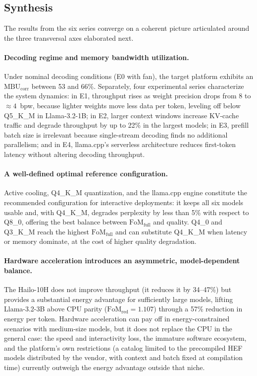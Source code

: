\documentclass[acmsmall,natbib=false]{acmart}
\begin{document}
\subsection{Synthesis}\label{sec:synthesis}

The results from the six series converge on a coherent picture articulated around the three
transversal axes elaborated next. 

\paragraph{Decoding regime and memory bandwidth utilization.}%
Under nominal decoding conditions (E0 with fan), the target platform exhibits an
$\mathrm{MBU}_{\mathrm{corr}}$ between 53 and 66\%. Separately, four experimental
series characterize the system dynamics: in E1, throughput rises as weight
precision drops from 8 to ${\approx}4$~bpw, because lighter weights move less data
per token, leveling off below Q5\_K\_M in Llama-3.2-1B; in E2, larger context
windows increase KV-cache traffic and degrade throughput by up to 22\% in the
largest models; in E3, prefill batch size is irrelevant because single-stream
decoding finds no additional parallelism; and in E4, llama.cpp's serverless
architecture reduces first-token latency without altering decoding throughput.

\paragraph{A well-defined optimal reference configuration.}
Active cooling, Q4\_K\_M quantization, and the llama.cpp engine constitute
the recommended configuration for interactive deployments: it keeps all six
models usable and, with Q4\_K\_M, degrades perplexity by less than 5\% with
respect to Q8\_0, offering the best balance between $\mathrm{FoM}_{\mathrm{full}}$ and quality.
Q4\_0 and Q3\_K\_M reach the highest $\mathrm{FoM}_{\mathrm{full}}$ and can substitute Q4\_K\_M when
latency or memory dominate, at the cost of higher quality degradation.

\paragraph{Hardware acceleration introduces an asymmetric, model-dependent
balance.}
The Hailo-10H does not improve throughput (it reduces it by 34--47\%) but
provides a substantial energy advantage for sufficiently large models,
lifting Llama-3.2-3B above CPU parity
($\mathrm{FoM}_{\mathrm{red}}=1.107$) through a 57\% reduction in energy per
token. Hardware acceleration can pay off in energy-constrained scenarios
with medium-size models, but it does not replace the CPU in the general
case: the speed and interactivity loss, the immature software ecosystem, and
the platform's own restrictions (a catalog limited to the precompiled HEF
models distributed by the vendor, with context and batch fixed at
compilation time) currently outweigh the energy advantage outside that
niche.
\end{document}
